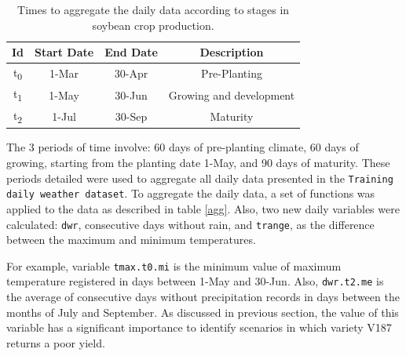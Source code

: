 \documentclass[syngen,nonblindrev]{informs3-syngen}
\begin{document}
\begin{table}
\begin{center}
\begin{tabular}{cccc}
\hline
Id    & Start Date & End Date & Description   \\
\hline
t\textsubscript{0}      & 1-Mar    & 30-Apr & Pre-Planting   \\
t\textsubscript{1}      & 1-May    & 30-Jun & Growing and development    \\
t\textsubscript{2}      & 1-Jul    & 30-Sep & Maturity \\
\hline
\end{tabular}
\end{center}
\caption{Times to aggregate the daily data according to stages in soybean crop production.}\label{stages}
\end{table}

The 3 periods of time involve: 60 days of pre-planting climate, 60 days of growing, starting from the planting date 1-May, and 90 days of maturity. 
These periods detailed were used to aggregate all daily data presented in the \texttt{Training daily weather dataset}. 
To aggregate the daily data, a set of functions was applied to the data as described in table \ref{agg}. 
Also, two new daily variables were calculated: \texttt{dwr}, consecutive days without rain, and \texttt{trange}, as the difference between the maximum and minimum temperatures. 

For example, variable \texttt{tmax.t0.mi} is the minimum value of maximum temperature registered in days between 1-May and 30-Jun. 
Also, \texttt{dwr.t2.me} is the average of consecutive days without precipitation records in days between the months of July and September. 
As discussed in previous section, the value of this variable has a significant importance to identify scenarios in which variety V187 returns a poor yield.
\end{document}
